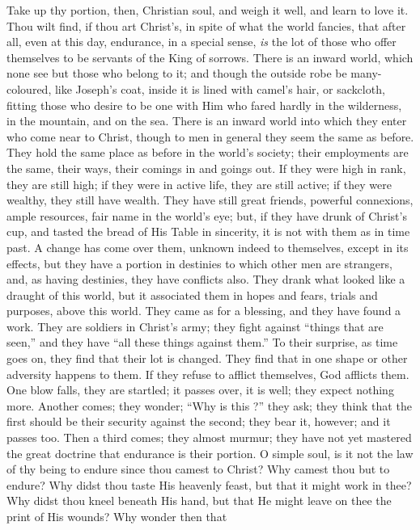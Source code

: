 Take up thy portion, then, Christian soul, and weigh it well, and
learn to love it. Thou wilt find, if thou art Christ's, in spite of
what the world fancies, that after all, even at this day, endurance,
in a special sense, \emph{is} the lot of those who offer themselves to
be servants of the King of sorrows. There is an inward world, which
none see but those who belong to it; and though the outside robe be
many-coloured, like Joseph's coat, inside it is lined with camel's
hair, or sackcloth, fitting those who desire to be one with Him who
fared hardly in the wilderness, in the mountain, and on the sea. There
is an inward world into which they enter who come near to Christ,
though to men in general they seem the same as before. They hold the
same place as before in the world's society; their employments are the
same, their ways, their comings in and goings out. If they were high
in rank, they are still high; if they were in active life, they are
still active; if they were wealthy, they still have wealth. They have
still great friends, powerful connexions, ample resources, fair name
in the world's eye; but, if they have drunk of Christ's cup, and
tasted the bread of His Table in sincerity, it is not with them as in
time past. A change has come over them, unknown indeed to themselves,
except in its effects, but they have a portion in destinies to which
other men are strangers, and, as having destinies, they have conflicts
also. They drank what looked like a draught of this world, but it
associated them in hopes and fears, trials and purposes, above this
world. They came as for a blessing, and they have found a work. They
are soldiers in Christ's army; they fight against ``things that
are seen,'' and they have ``all these things against
them.'' To their surprise, as time goes on, they find that their
lot is changed. They find that in one shape or other adversity happens
to them. If they refuse to afflict themselves, God afflicts them. One
blow falls, they are startled; it passes over, it is well; they expect
nothing more. Another comes; they wonder; ``Why is this ?''
they ask; they think that the first should be their security against
the second; they bear it, however; and it passes too. Then a third
comes; they almost murmur; they have not yet mastered the great
doctrine that endurance is their portion. O simple soul, is it not the
law of thy being to endure since thou camest to Christ? Why camest
thou but to endure? Why didst thou taste His heavenly feast, but that
it might work in thee? Why didst thou kneel beneath His hand, but that
He might leave on thee the print of His wounds? Why wonder then that
